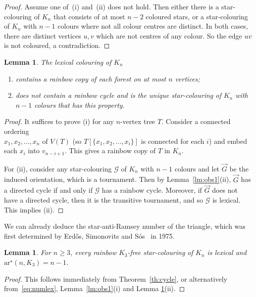 \documentclass[a4paper, 12pt]{article}
\newcommand{\sG}{lexical }
\numberwithin{equation}{section}
\newtheorem{lemma}[theorem]{Lemma}
\def\sar{{\mathrm{ar}^{\star}}}
\newcommand{\ova}[1]{\overrightarrow{#1}}
\newcommand{\ms}[1]{\mathscr{#1}}
\begin{document}
\begin{proof}
Assume one of~(i) and~(ii) does not hold. Then  either there is a star-colouring of $K_n$ that consists of at most $n-2$ coloured stars, or a star-colouring of $K_n$ with $n-1$ colours where not all colour centres are distinct. In both cases, there are distinct vertices $u,v$ which are not centres of any colour. So the edge $uv$ is not coloured, a contradiction. %
\end{proof}




\begin{lemma}\label{lm:lexical}
The \sG colouring of $K_n$
\begin{enumerate}
	\item contains a rainbow copy of each forest on at most $n$ vertices;
	
	\item does not contain a rainbow cycle  and is the unique star-colouring of $K_n$ with $n-1$ colours that has this property. 
\end{enumerate}
\end{lemma}

\begin{proof}
 It suffices to prove (i) for any $n$-vertex tree $T$. Consider a connected ordering \\ $x_1, x_2, \ldots, x_n$ of $V(T)$ (so $T[\{x_1,x_2,\ldots , x_i\}]$ is connected for each $i$) and embed each $x_i$ into $v_{n-i+1}$. This gives a rainbow copy of $T$ in $K_n$.

For (ii), consider any star-colouring $\ms{G}$ of $K_n$ with $n-1$ colours and let $\ova{G}$ be the induced orientation, which is a tournament. Then by Lemma~\ref{lm:obs1}(ii), $\ova{G}$ has a directed cycle if and only if $\ms{G}$ has a rainbow cycle. Moreover, if $\ova{G}$ does not have a directed cycle, then it is the transitive tournament, and so $\ms{G}$ is lexical. This implies (ii).
\end{proof}

We can already deduce the star-anti-Ramsey number of the triangle, which was first determined by Erd\H{o}s, Simonovits and S\'os~\cite{ErdosSimonovitsSos} in 1975.


\begin{lemma}\label{th:K3}
For  $n \ge 3$, every rainbow $K_3$-free star-colouring of $K_n$ is lexical and $\sar(n, K_3) = n-1$.
\end{lemma}

\begin{proof}
This follows immediately  from Theorem~\ref{th:cycle}, or alternatively  from~\eqref{eq:numlex}, Lemma~\ref{lm:obs1}(i) and Lemma \ref{lm:lexical}(ii).
\end{proof}
\end{document}
